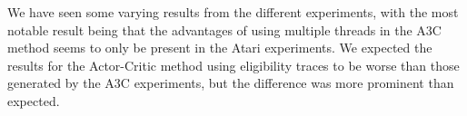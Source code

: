\documentclass[11pt]{article}
\begin{document}
We have seen some varying results from the different experiments, with
the most notable result being that the advantages of using multiple threads in the A3C method
seems to only be present in the Atari experiments.
We expected the results for the Actor-Critic method using eligibility traces
to be worse than those generated by the A3C experiments, 
but the difference was more prominent than expected.
\end{document}
